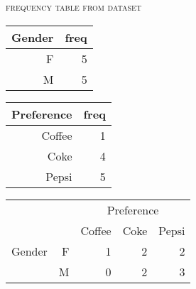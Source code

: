 \documentclass[dvipdfmx, serif,handout]{beamer}
\begin{document}
\begin{frame}{\textsc{frequency table from dataset}}

	\begin{minipage}{0.4\hsize}
		\footnotesize
		\begin{table}[ht]
			\centering
			\begin{tabular}{rr}
				\hline
				Gender & freq \\
				\hline
				F      & 5    \\
				M      & 5    \\
				\hline
			\end{tabular}
		\end{table}
	\end{minipage}
	\begin{minipage}{0.4\hsize}
		\begin{table}[ht]
			\centering
			\begin{tabular}{rr}
				\hline
				Preference & freq \\
				\hline
				Coffee     & 1    \\
				Coke       & 4    \\
				Pepsi      & 5    \\
				\hline
			\end{tabular}
		\end{table}
	\end{minipage}

	\begin{table}[ht]
		\centering
		\begin{tabular}{rrrrr}
			\hline
			       &   & \multicolumn{3}{c}{Preference}                \\
			       &   & Coffee                         & Coke & Pepsi \\
			\hline
			Gender & F & 1                              & 2    & 2     \\
			       & M & 0                              & 2    & 3     \\
			\hline
		\end{tabular}
	\end{table}



\end{frame}
\end{document}
